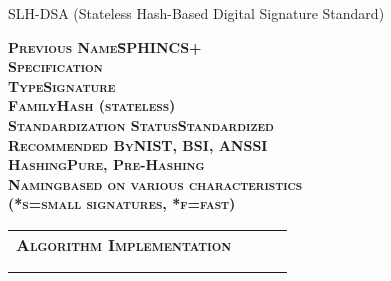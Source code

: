 \documentclass[11pt,english,a4paper, landscape]{scrartcl}
\begin{document}
	\begin{algorithmbox}{SLH-DSA (Stateless Hash-Based Digital Signature Standard)}
		\begin{minipage}[t]{0.3\textwidth}
			\scriptsize
			\begin{center}
			\end{center}
			\begin{tabbing}
				\bfseries \scshape Previous Name\hspace{2cm}\=SPHINCS+\\
				\bfseries \scshape Specification\>\\
				\bfseries \scshape Type\>Signature\\
				\bfseries \scshape Family\>Hash (stateless)\\
				\bfseries \scshape Standardization Status\>Standardized\\
				\bfseries \scshape Recommended By\>NIST, BSI, ANSSI\\
				\bfseries \scshape Hashing\>Pure, Pre-Hashing\\
				\bfseries \scshape Naming\>based on various characteristics\\
				\>(*s=small signatures, *f=fast)
			\end{tabbing}
			\begin{tabular}[t]{l c  c  c}
				\scshape\bfseries Algorithm Implementation &\textcolor{themegreydark}{\faKey}&\textcolor{themegreydark}{\faPen}&\textcolor{themegreydark}{\faQuestionCircle}\\
				&&&\\
				\hline\\



\end{tabular}
\end{minipage}
\end{algorithmbox}
\end{document}
